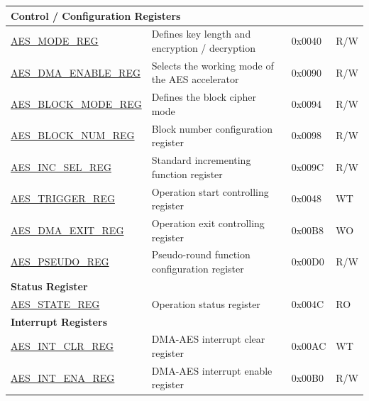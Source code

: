\begin{longtable}{ | l | l | l | l | }
\multicolumn{4}{|l|}{\textbf{Control / Configuration Registers}} \\ \hline

\hyperref[regdesc:AESMODEREG]{AES\_MODE\_REG}				            &	Defines key length and encryption / decryption			    & 0x0040 & R/W \\ \hline
\hyperref[regdesc:AESDMAENABLEREG]{AES\_DMA\_ENABLE\_REG}		        &	Selects the working mode of the AES accelerator					                & 0x0090 & R/W \\ \hline
\hyperref[regdesc:AESBLOCKMODEREG]{AES\_BLOCK\_MODE\_REG}		        &	Defines the block cipher mode			        & 0x0094 & R/W \\ \hline
\hyperref[regdesc:AESBLOCKNUMREG]{AES\_BLOCK\_NUM\_REG}		   	        &	Block number configuration register			        & 0x0098 & R/W \\ \hline
\hyperref[regdesc:AESINCSELREG]{AES\_INC\_SEL\_REG}			            &	Standard incrementing function register               & 0x009C & R/W \\ \hline
\hyperref[regdesc:AESTRIGGERREG]{AES\_TRIGGER\_REG}			&	Operation start controlling register		& 0x0048 & WT \\ \hline
\hyperref[regdesc:AESDMAEXITREG]{AES\_DMA\_EXIT\_REG}		&	Operation exit controlling register	& 0x00B8 & WO \\ \hline
\hyperref[regdesc:AESPSEUDOREG]{AES\_PSEUDO\_REG} & Pseudo-round function configuration register & 0x00D0 & R/W \\ \hline

\multicolumn{4}{|l|}{\textbf{Status Register}} \\ \hline
\hyperref[regdesc:AESSTATEREG]{AES\_STATE\_REG}				&	Operation status register			& 0x004C & RO \\ \hline
\multicolumn{4}{|l|}{\textbf{Interrupt Registers}} \\ \hline

\hyperref[regdesc:AESINTCLRREG]{AES\_INT\_CLR\_REG}			&	DMA-AES interrupt clear register	& 0x00AC & WT \\ \hline
\hyperref[regdesc:AESINTENAREG]{AES\_INT\_ENA\_REG}			&	DMA-AES interrupt enable register	& 0x00B0 & R/W \\ \hline

\end{longtable}
